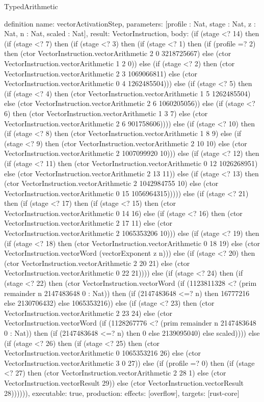 \begin{lexlean}{TypedArithmetic}
\begin{semanticmodule}
definition{
  name: vectorActivationStep,
  parameters: [profile : Nat, stage : Nat, z : Nat, n : Nat, scaled : Nat],
  result: VectorInstruction,
  body: (if (stage <? 14) then (if (stage <? 7) then (if (stage <? 3) then (if (stage <? 1) then (if (profile =? 2) then (ctor VectorInstruction.vectorArithmetic 2 0 3218725667) else (ctor VectorInstruction.vectorArithmetic 1 2 0)) else
    (if (stage <? 2) then (ctor VectorInstruction.vectorArithmetic 2 3 1069066811) else
    (ctor VectorInstruction.vectorArithmetic 0 4 1262485504))) else
    (if (stage <? 5) then (if (stage <? 4) then (ctor VectorInstruction.vectorArithmetic 1 5 1262485504) else
    (ctor VectorInstruction.vectorArithmetic 2 6 1060205056)) else
    (if (stage <? 6) then (ctor VectorInstruction.vectorArithmetic 1 3 7) else
    (ctor VectorInstruction.vectorArithmetic 2 6 901758606)))) else
    (if (stage <? 10) then (if (stage <? 8) then (ctor VectorInstruction.vectorArithmetic 1 8 9) else
    (if (stage <? 9) then (ctor VectorInstruction.vectorArithmetic 2 10 10) else
    (ctor VectorInstruction.vectorArithmetic 2 1007099920 10))) else
    (if (stage <? 12) then (if (stage <? 11) then (ctor VectorInstruction.vectorArithmetic 0 12 1026268951) else
    (ctor VectorInstruction.vectorArithmetic 2 13 11)) else
    (if (stage <? 13) then (ctor VectorInstruction.vectorArithmetic 2 1042984755 10) else
    (ctor VectorInstruction.vectorArithmetic 0 15 1056964315))))) else
    (if (stage <? 21) then (if (stage <? 17) then (if (stage <? 15) then (ctor VectorInstruction.vectorArithmetic 0 14 16) else
    (if (stage <? 16) then (ctor VectorInstruction.vectorArithmetic 2 17 11) else
    (ctor VectorInstruction.vectorArithmetic 2 1065353206 10))) else
    (if (stage <? 19) then (if (stage <? 18) then (ctor VectorInstruction.vectorArithmetic 0 18 19) else
    (ctor VectorInstruction.vectorWord (vectorExponent z n))) else
    (if (stage <? 20) then (ctor VectorInstruction.vectorArithmetic 2 20 21) else
    (ctor VectorInstruction.vectorArithmetic 0 22 21)))) else
    (if (stage <? 24) then (if (stage <? 22) then (ctor VectorInstruction.vectorWord (if (1123811328 <? (prim remainder n 2147483648 0 : Nat)) then (if (2147483648 <=? n) then 16777216 else 2130706432) else 1065353216)) else
    (if (stage <? 23) then (ctor VectorInstruction.vectorArithmetic 2 23 24) else
    (ctor VectorInstruction.vectorWord (if (1128267776 <? (prim remainder n 2147483648 0 : Nat)) then (if (2147483648 <=? n) then 0 else 2139095040) else scaled)))) else
    (if (stage <? 26) then (if (stage <? 25) then (ctor VectorInstruction.vectorArithmetic 0 1065353216 26) else
    (ctor VectorInstruction.vectorArithmetic 3 0 27)) else
    (if (profile =? 0) then (if (stage <? 27) then (ctor VectorInstruction.vectorArithmetic 2 28 1) else
    (ctor VectorInstruction.vectorResult 29)) else (ctor VectorInstruction.vectorResult 28)))))),
  executable: true,
  production: {effects: [overflow], targets: [rust-core]}
}


\end{semanticmodule}
\end{lexlean}

